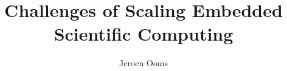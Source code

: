 \documentclass[PhD]{uclathes}\usepackage[]{graphicx}\usepackage[]{color}
\title{Challenges of Scaling Embedded Scientific Computing}
\author{Jeroen Ooms}
\begin{document}
\makeintropages














\end{document}
